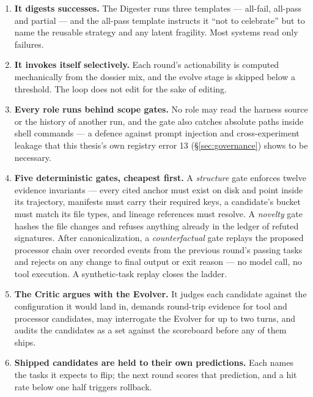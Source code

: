 \begin{enumerate}
  \item \textbf{It digests successes.} The Digester runs three templates ---
        all-fail, all-pass and partial --- and the all-pass template
        instructs it ``not to celebrate'' but to name the reusable strategy
        and any latent fragility. Most systems read only failures.
  \item \textbf{It invokes itself selectively.} Each round's actionability
        is computed mechanically from the dossier mix, and the evolve stage
        is skipped below a threshold. The loop does not edit for the sake
        of editing.
  \item \textbf{Every role runs behind scope gates.} No role may read the
        harness source or the history of another run, and the gate also
        catches absolute paths inside shell commands --- a defence against
        prompt injection and cross-experiment leakage that this thesis's
        own registry error 13 (\S\ref{sec:governance}) shows to be
        necessary.
  \item \textbf{Five deterministic gates, cheapest first.} A
        \emph{structure} gate enforces twelve evidence invariants --- every
        cited anchor must exist on disk and point inside its trajectory,
        manifests must carry their required keys, a candidate's bucket must
        match its file types, and lineage references must resolve. A
        \emph{novelty} gate hashes the file changes and refuses anything
        already in the ledger of refuted signatures. After
        canonicalization, a \emph{counterfactual} gate replays the proposed
        processor chain over recorded events from the previous round's
        passing tasks and rejects on any change to final output or exit
        reason --- no model call, no tool execution. A synthetic-task replay
        closes the ladder.
  \item \textbf{The Critic argues with the Evolver.} It judges each
        candidate against the configuration it would land in, demands
        round-trip evidence for tool and processor candidates, may
        interrogate the Evolver for up to two turns, and audits the
        candidates as a set against the scoreboard before any of them
        ships.
  \item \textbf{Shipped candidates are held to their own predictions.} Each
        names the tasks it expects to flip; the next round scores that
        prediction, and a hit rate below one half triggers rollback.
\end{enumerate}

